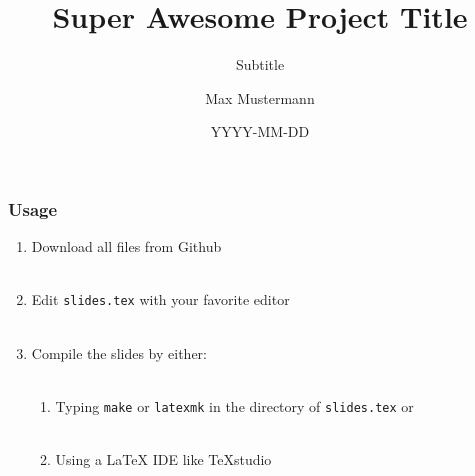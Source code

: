 \documentclass[aspectratio=1610]{beamer}
\title[Short Title]{Super Awesome Project Title}
\subtitle{Subtitle}
\author{Max Mustermann}
\date{YYYY-MM-DD}
\institute{Helmholtz Center ABC}
\begin{document}
\maketitle


\begin{frame}
    \frametitle{Usage}

    \begin{enumerate}
        \item Download all files from Github\\~
        \item Edit \texttt{slides.tex} with your favorite editor\\~
        \item Compile the slides by either:\\~
        \begin{enumerate}
            \item Typing \texttt{make} or \texttt{latexmk} in the directory of \texttt{slides.tex} or\\~
            \item Using a LaTeX IDE like TeXstudio\\~
        \end{enumerate}
    \end{enumerate}
\end{frame}
\end{document}
